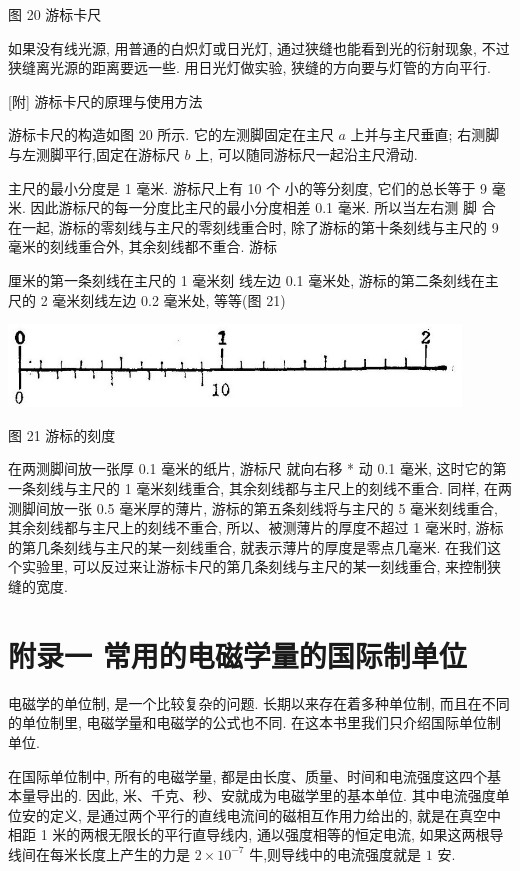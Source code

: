 \documentclass[10pt]{article}
\begin{document}
图 20 游标卡尺

如果没有线光源, 用普通的白炽灯或日光灯, 通过狭缝也能看到光的衍射现象, 不过狭缝离光源的距离要远一些. 用日光灯做实验, 狭缝的方向要与灯管的方向平行.

[附] 游标卡尺的原理与使用方法

游标卡尺的构造如图 20 所示. 它的左测脚固定在主尺 \(a\) 上并与主尺垂直; 右测脚与左测脚平行,固定在游标尺 \(b\) 上, 可以随同游标尺一起沿主尺滑动.

主尺的最小分度是 1 毫米. 游标尺上有 10 个 小的等分刻度, 它们的总长等于 9 毫米. 因此游标尺的每一分度比主尺的最小分度相差 0.1 毫米. 所以当左右测 脚 合 在一起, 游标的零刻线与主尺的零刻线重合时, 除了游标的第十条刻线与主尺的 9 毫米的刻线重合外, 其余刻线都不重合. 游标

厘米的第一条刻线在主尺的 1 毫米刻 线左边 0.1 毫米处, 游标的第二条刻线在主尺的 2 毫米刻线左边 0.2 毫米处, 等等(图 21)

\begin{center}
\includegraphics[max width=0.9\textwidth]{images/01913056-1f15-74d8-9184-9aab52c9d66b_396_322906.jpg}
\end{center}

图 21 游标的刻度

在两测脚间放一张厚 0.1 毫米的纸片, 游标尺 就向右移 * 动 0.1 毫米, 这时它的第一条刻线与主尺的 1 毫米刻线重合, 其余刻线都与主尺上的刻线不重合. 同样, 在两测脚间放一张 0.5 毫米厚的薄片, 游标的第五条刻线将与主尺的 5 毫米刻线重合, 其余刻线都与主尺上的刻线不重合, 所以、被测薄片的厚度不超过 1 毫米时, 游标的第几条刻线与主尺的某一刻线重合, 就表示薄片的厚度是零点几毫米. 在我们这个实验里, 可以反过来让游标卡尺的第几条刻线与主尺的某一刻线重合, 来控制狭缝的宽度.

\section*{附录一 常用的电磁学量的国际制单位}

电磁学的单位制, 是一个比较复杂的问题. 长期以来存在着多种单位制, 而且在不同的单位制里, 电磁学量和电磁学的公式也不同. 在这本书里我们只介绍国际单位制单位.

在国际单位制中, 所有的电磁学量, 都是由长度、质量、时间和电流强度这四个基本量导出的. 因此, 米、千克、秒、安就成为电磁学里的基本单位. 其中电流强度单位安的定义, 是通过两个平行的直线电流间的磁相互作用力给出的, 就是在真空中相距 1 米的两根无限长的平行直导线内, 通以强度相等的恒定电流, 如果这两根导线间在每米长度上产生的力是 \(2 \times {10}^{-7}\) 牛,则导线中的电流强度就是 \(1\) 安.
\end{document}
